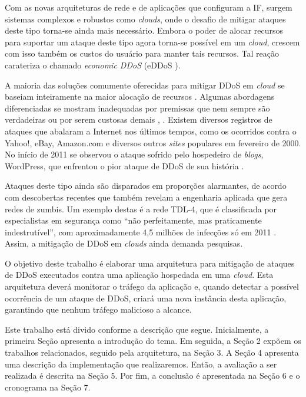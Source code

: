 Com as novas arquiteturas de rede e de aplicações que configuram a IF, surgem sistemas complexos e robustos como \emph{clouds}, onde o desafio de mitigar ataques deste tipo torna-se ainda mais necessário.  Embora o poder de
alocar recursos para suportar um ataque deste tipo  agora torna-se
possível em um \emph{cloud}, crescem com isso também os custos do usuário para manter tais recursos. Tal reação
carateriza o chamado \emph{economic DDoS} (eDDoS \cite{Soon:10}).
  
A maioria das soluções comumente oferecidas para mitigar DDoS em \emph{cloud} se baseiam inteiramente na maior alocação de
recursos \cite{Peng:2007:SND:1216370.1216373}.  %
%
Algumas abordagens diferenciadas se mostram inadequadas por premissas que nem sempre são verdadeiras ou por serem custosas demais \cite{Bakshi:10}, \cite{Liu:2010:NFD:1866835.1866849}.
Existem diversos registros de ataques que abalaram a Internet nos últimos tempos, como os ocorridos contra o Yahoo!, eBay, Amazon.com e diversos outros \emph{sites} populares em fevereiro de 2000.  No início de 2011 se observou o ataque sofrido pelo hospedeiro de \emph{blogs}, WordPress, que enfrentou o pior ataque de DDoS de sua história \cite{infoexame}.

Ataques deste tipo ainda são disparados em proporções alarmantes, de acordo com descobertas recentes que também revelam a engenharia aplicada que gera redes de zumbis. Um exemplo destas é a rede TDL-4, que é classificada por especialistas em segurança como “não perfeitamente, mas praticamente indestrutível”, com aproximadamente 4,5 milhões de infecções só em 2011 \cite{tdl4}. Assim, a mitigação de DDoS em \emph{clouds} ainda demanda pesquisas.

O objetivo deste trabalho é elaborar uma arquitetura para mitigação de ataques de
DDoS executados contra uma aplicação hospedada em uma \emph{cloud}. Esta
arquitetura deverá monitorar o tráfego da aplicação e, quando
detectar a possível ocorrência de um ataque de DDoS, criará uma nova
instância desta aplicação, garantindo que nenhum tráfego malicioso a alcance. 


Este trabalho está divido conforme a descrição que segue. Inicialmente,  
a primeira Seção apresenta a introdução do tema. Em seguida, a Seção 2 expõem os trabalhos relacionados, seguido pela arquitetura, na Seção 3. A Seção 4 apresenta uma descrição da implementação que realizaremos. Então, a avaliação a ser realizada é descrita na Seção 5. Por fim, a conclusão é apresentada na Seção 6 e o cronograma na Seção 7.

